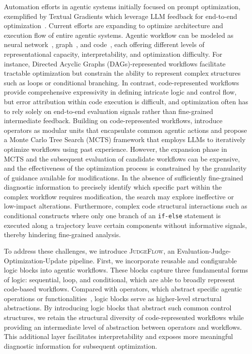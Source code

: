 \documentclass{article}
\theoremstyle{plain}
\theoremstyle{definition}
\theoremstyle{remark}
\def \our{\textsc{JudgeFlow}}
\begin{document}
Automation efforts in agentic systems initially focused on prompt optimization, exemplified by Textual Gradients which leverage LLM feedback for end-to-end optimization~\citep{pryzant_automatic_2023, yuksekgonul_textgrad_2024, wang_how_2024, yin_llm-autodiff_2025}. Current efforts are expanding to optimize architecture and execution flow of entire agentic systems. Agentic workflow can be modeled as neural network~\citep{liu_dynamic_2024,ma_agentic_2025}, graph~\citep{zhuge_language_2024, zhang_multi-agent_2025}, and code~\citep{hu_automated_2025, zhang_aflow_2025, zheng_mermaidflow_2025}, each offering different levels of representational capacity, interpretability, and optimization difficulty. For instance, Directed Acyclic Graphs (DAGs)-represented workflows facilitate tractable optimization but constrain the ability to represent complex structures such as loops or conditional branching. In contrast, code-represented workflows provide comprehensive expressivity in defining intricate logic and control flow, but error attribution within code execution is difficult, and optimization often has to rely solely on end-to-end evaluation signals rather than fine-grained intermediate feedback. Building on code-represented workflows, \citet{zhang_aflow_2025} introduce operators as modular units that encapsulate common agentic actions and propose a Monte Carlo Tree Search (MCTS) framework that employs LLMs to iteratively optimize workflows using past experience. However, the expansion phase in MCTS and the subsequent evaluation of candidate workflows can be expensive, and the effectiveness of the optimization process is constrained by the granularity of guidance available for modifications. In the absence of sufficiently fine-grained diagnostic information to precisely identify which specific part within the complex workflow requires modification, the search may explore ineffective or low-impact alterations. Furthermore, complex code structural interactions such as conditional constructs where only one branch of an \texttt{if-else} statement is executed along a trajectory leave certain components without informative signals, thereby hindering fine-grained analysis. 




To address these challenges, we introduce {\our{}}, an Evaluation-Judge-Optimization-Update pipeline. First, we incorporate reusable and configurable logic blocks into agentic workflows. These blocks capture three fundamental forms of logic: sequential, loop, and conditional, which are able to broadly represent code-based workflows. Compared with operators, which abstract specific agentic operations or functionalities~\citep{zhang_aflow_2025}, logic blocks serve as higher-level structural abstractions. By introducing logic blocks that abstract such common control structures, we retain the structural diversity of code-represented workflows while providing an intermediate level of abstraction between operators and workflows. This additional layer facilitates interpretability and exposes more meaningful diagnostic information for subsequent optimization. 
\end{document}
